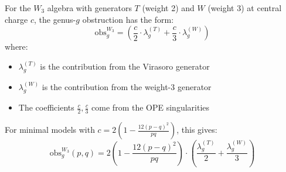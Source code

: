 \begin{theorem}\label{thm:w3-obstruction}
For the $W_3$ algebra with generators $T$ (weight 2) and $W$ (weight 3) at 
central charge $c$, the genus-$g$ obstruction has the form:
\begin{equation}
\text{obs}_g^{W_3} = \left(\frac{c}{2} \cdot \lambda_g^{(T)} + 
\frac{c}{3} \cdot \lambda_g^{(W)}\right)
\end{equation}
where:
\begin{itemize}
\item $\lambda_g^{(T)}$ is the contribution from the Virasoro generator
\item $\lambda_g^{(W)}$ is the contribution from the weight-3 generator
\item The coefficients $\frac{c}{2}, \frac{c}{3}$ come from the OPE singularities
\end{itemize}

For minimal models with $c = 2(1 - \frac{12(p-q)^2}{pq})$, this gives:
$$\text{obs}_g^{W_3}(p,q) = 2\left(1 - \frac{12(p-q)^2}{pq}\right) \cdot 
\left(\frac{\lambda_g^{(T)}}{2} + \frac{\lambda_g^{(W)}}{3}\right)$$
\end{theorem}

